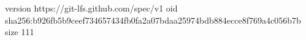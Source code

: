 version https://git-lfs.github.com/spec/v1
oid sha256:b926fb5b9ceef734657434fb0fa2a07bdaa25974bdb884ecce8f769a4c056b7b
size 111

